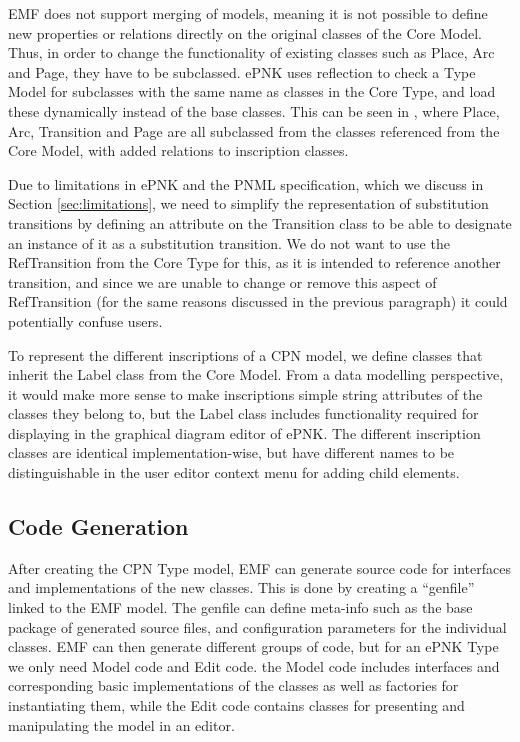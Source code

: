

EMF does not support merging of models, meaning it is not possible to define new
properties or relations directly on the original classes of the Core Model.
Thus, in order to change the functionality of existing classes such as Place,
Arc and Page, they have to be subclassed. ePNK uses reflection to check a
Type Model for subclasses with the same name as classes in the Core Type, and
load these dynamically instead of the base classes.
This can be seen in , where Place, Arc, Transition and
Page are all subclassed from the classes referenced from the Core Model, with
added relations to inscription classes.

Due to limitations in ePNK and the PNML specification, which we discuss in
Section \ref{sec:limitations}, we need to simplify the representation of substitution
transitions by defining an attribute on the Transition class to be able to
designate an instance of it as a substitution transition. We do not want to use
the RefTransition from the Core Type for this, as it is intended to reference
another transition, and since we are unable to change or remove this aspect of
RefTransition (for the same reasons discussed in the previous paragraph) it
could potentially confuse users.

To represent the different inscriptions of a CPN model, we define classes that
inherit the Label class from the Core Model. From a data modelling
perspective, it would make more sense to make inscriptions simple
string attributes of the classes they belong to, but the Label class includes
functionality required for displaying in the graphical diagram editor of ePNK.
The different inscription classes are identical implementation-wise, but have
different names to be distinguishable in the user editor context menu for adding
child elements.

\subsection{Code Generation}
After creating the CPN Type model, EMF can generate source code for interfaces
and implementations of the new classes. This is done by creating a ``genfile''
linked to the EMF model. The genfile can define meta-info such as the base
package of generated source files, and configuration parameters for the
individual classes. EMF can then generate different groups of code, but for an
ePNK Type we only need Model code and Edit code. the Model code includes
interfaces and corresponding basic implementations of the classes as well as
factories for instantiating them, while the Edit code contains classes for
presenting and manipulating the model in an editor.

